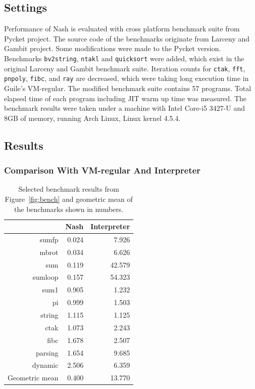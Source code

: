 \documentclass[preprint, 10pt]{sigplanconf}
\begin{document}
\subsection{Settings}

Performance of Nash is evaluated with cross platform benchmark suite from
Pycket project. The source code of the benchmarks originate from Larceny and
Gambit project. Some modifications were made to the Pycket version. Benchmarks
\texttt{bv2string}, \texttt{ntakl} and \texttt{quicksort} were added, which
exist in the original Larceny and Gambit benchmark suite. Iteration counts for
\texttt{ctak}, \texttt{fft}, \texttt{pnpoly}, \texttt{fibc}, and \texttt{ray}
are decreased, which were taking long execution time in Guile's
VM-regular. The modified benchmark suite contains 57 programs. Total elapsed
time of each program including JIT warm up time was measured. The benchmark
results were taken under a machine with Intel Core-i5 3427-U and 8GB of
memory, running Arch Linux, Linux kernel 4.5.4.

\subsection{Results}
\label{sec:results}

\subsubsection{Comparison With VM-regular And Interpreter}
\label{sec:guilecomp}

\begin{table}
  \centering
  \begin{tabular}{rrr}
     & Nash & Interpreter \\
    \toprule
    sumfp & 0.024 & 7.926 \\
    mbrot & 0.034 & 6.626 \\
    sum & 0.119 & 42.579 \\
    sumloop & 0.157 & 54.323 \\
    \midrule
    sum1 & 0.905 & 1.232 \\
    pi & 0.999 & 1.503 \\
    string & 1.115 & 1.125 \\
    \midrule
    ctak & 1.073 & 2.243 \\
    fibc & 1.678 & 2.507 \\
    parsing & 1.654 & 9.685 \\
    dynamic & 2.506 & 6.359 \\
    \midrule
    Geometric mean & 0.400 & 13.770 \\
  \end{tabular}
  \caption{Selected benchmark results from
    Figure~\hyperref[fig:bench]{\ref{fig:bench}} and geometric mean of the
    benchmarks shown in numbers.}
\label{tab:compguile}
\end{table}
\end{document}
